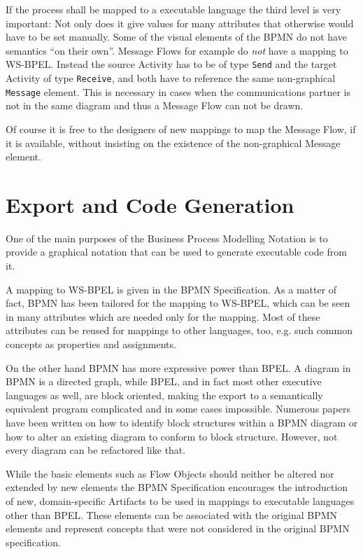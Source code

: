 If the process shall be mapped to a executable language the third level is very
important: Not only does it give values for many attributes that otherwise would
have to be set manually.  Some of the visual elements of the BPMN do not have
semantics ``on their own''.  Message Flows for example do \emph{not} have a
mapping to WS-BPEL.  Instead the source Activity has to be of type \texttt{Send}
and the target Activity of type \texttt{Receive}, and both have to reference the
same non-graphical \texttt{Message} element.  This is necessary in cases when the
communications partner is not in the same diagram and thus a Message Flow can not
be drawn.

Of course it is free to the designers of new mappings to map the Message Flow, if
it is available, without insisting on the existence of the non-graphical Message
element.



\section{Export and Code Generation}
\label{sec:bpmn_export}

One of the main purposes of the Business Process Modelling Notation is to provide
a graphical notation that can be used to generate executable code from it.

A mapping to WS-BPEL is given in the BPMN Specification.  As a matter of fact,
BPMN has been tailored for the mapping to WS-BPEL, which can be seen in many
attributes which are needed only for the mapping.  Most of these attributes can
be reused for mappings to other languages, too, e.g. such common concepts as
properties and assignments.

On the other hand BPMN has more expressive power than BPEL.  A diagram in BPMN is
a directed graph, while BPEL, and in fact most other executive languages as well,
are block oriented, making the export to a semantically equivalent program
complicated and in some cases impossible.  Numerous papers have been written on
how to identify block structures within a BPMN diagram or how to alter an existing
diagram to conform to block structure.  However, not every diagram can be
refactored like that.

While the basic elements such as Flow Objects should neither be altered nor
extended by new elements the BPMN Specification encourages the introduction of
new, domain-specific Artifacts to be used in mappings to executable languages
other than BPEL.  These elements can be associated with the original BPMN elements
and represent concepts that were not considered in the original BPMN specification.

